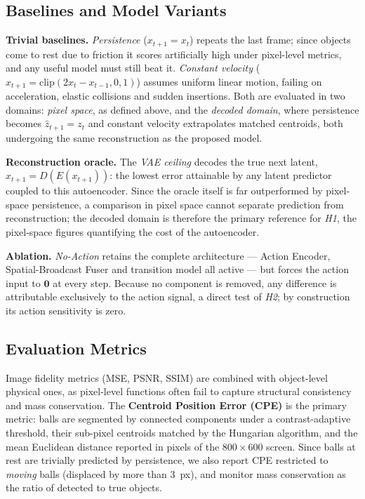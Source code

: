 \documentclass[conference]{IEEEtran}
\begin{document}
\subsection{Baselines and Model Variants}

\textbf{Trivial baselines.} \emph{Persistence} ($x_{t+1} = x_t$) repeats the last frame; since objects come to rest due to friction it scores artificially high under pixel-level metrics, and any useful model must still beat it. \emph{Constant velocity} ($x_{t+1} = \text{clip}(2x_t - x_{t-1}, 0, 1)$) assumes uniform linear motion, failing on acceleration, elastic collisions and sudden insertions. Both are evaluated in two domains: \emph{pixel space}, as defined above, and the \emph{decoded domain}, where persistence becomes $\hat{z}_{t+1} = z_t$ and constant velocity extrapolates matched centroids, both undergoing the same reconstruction as the proposed model.

\textbf{Reconstruction oracle.} The \emph{VAE ceiling} decodes the true next latent, $\hat{x}_{t+1} = D(E(x_{t+1}))$: the lowest error attainable by any latent predictor coupled to this autoencoder. Since the oracle itself is far outperformed by pixel-space persistence, a comparison in pixel space cannot separate prediction from reconstruction; the decoded domain is therefore the primary reference for \textit{H1}, the pixel-space figures quantifying the cost of the autoencoder.

\textbf{Ablation.} \emph{No-Action} retains the complete architecture --- Action Encoder, Spatial-Broadcast Fuser and transition model all active --- but forces the action input to $\mathbf{0}$ at every step. Because no component is removed, any difference is attributable exclusively to the action signal, a direct test of \textit{H2}; by construction its action sensitivity is zero.

\subsection{Evaluation Metrics}

Image fidelity metrics (MSE, PSNR, SSIM) are combined with object-level physical ones, as pixel-level functions often fail to capture structural consistency and mass conservation. The \textbf{Centroid Position Error (CPE)} is the primary metric: balls are segmented by connected components under a contrast-adaptive threshold, their sub-pixel centroids matched by the Hungarian algorithm, and the mean Euclidean distance reported in pixels of the $800 \times 600$ screen. Since balls at rest are trivially predicted by persistence, we also report CPE restricted to \emph{moving} balls (displaced by more than $3$~px), and monitor mass conservation as the ratio of detected to true objects.
\end{document}
